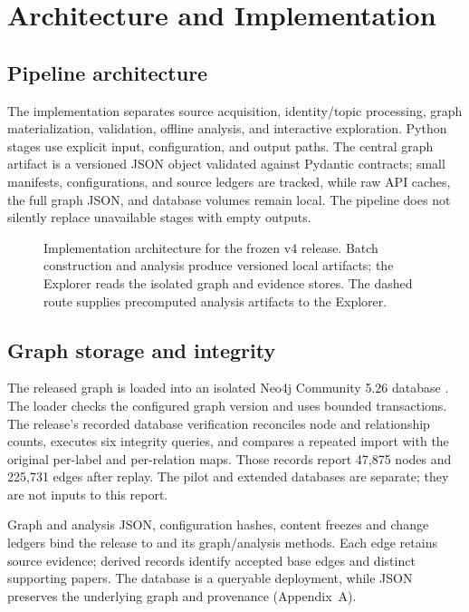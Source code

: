 \chapter{Architecture and Implementation}
\label{chap:implementation}

\section{Pipeline architecture}

The implementation separates source acquisition, identity/topic processing,
graph materialization, validation, offline analysis, and interactive exploration.
Python stages use explicit input, configuration, and output paths. The central
graph artifact is a versioned JSON object validated against Pydantic contracts;
small manifests, configurations, and source ledgers are tracked, while raw API
caches, the full graph JSON, and database volumes remain local. The pipeline
does not silently replace unavailable stages with empty outputs.

\begin{figure}[!htbp]
  \centering
  
  \caption[System architecture]{Implementation architecture for the frozen v4 release. Batch
  construction and analysis produce versioned local artifacts; the Explorer
  reads the isolated graph and evidence stores. The dashed route supplies
  precomputed analysis artifacts to the Explorer.}
  \label{fig:architecture}
\end{figure}

\section{Graph storage and integrity}

The released graph is loaded into an isolated Neo4j Community 5.26 database
\citep{neo4jDocs}. The loader checks the configured graph version and
uses bounded transactions. The release's recorded database verification
reconciles node and relationship counts, executes six integrity queries, and
compares a repeated import with the original per-label and per-relation maps.
Those records report 47,875 nodes and 225,731 edges after replay. The pilot and
extended databases are separate; they are not inputs to this report.

Graph and analysis JSON, configuration hashes, content freezes and change
ledgers bind the release to \GraphVersion{} and its graph/analysis methods.
Each edge retains source evidence; derived records identify accepted base edges
and distinct supporting papers. The database is a queryable deployment, while
JSON preserves the underlying graph and provenance (Appendix~A).

